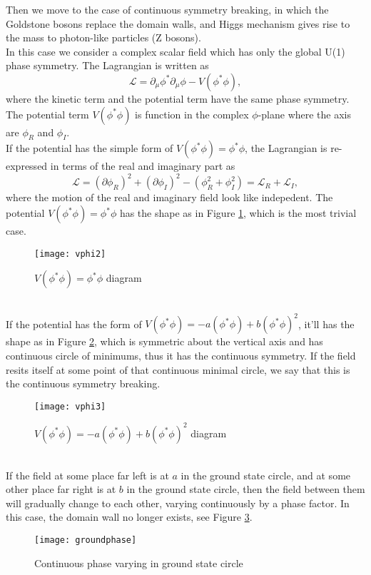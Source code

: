 \documentclass{article}
\newcommand{\be}{\begin{equation}}
\newcommand{\ee}{\end{equation}}
\newcommand{\p}{\partial}
\renewcommand{\1}{\left}
\renewcommand{\2}{\right}
\newcommand{\ma}{\mathcal}
\newcommand{\m}{\mu}
\begin{document}
Then we move to the case of continuous symmetry breaking, in which the Goldstone bosons replace the domain walls, and Higgs mechanism gives rise to the mass to photon-like particles (Z bosons).\\
In this case we consider a complex scalar field which has only the global U(1) phase symmetry. The Lagrangian is written as
\be
\ma L=\p_\m \phi^*\p_\m \phi-V(\phi^*\phi),
\ee
where the kinetic term and the potential term have the same phase symmetry. The potential term $V(\phi^*\phi)$ is function in the complex $\phi$-plane where the axis are $\phi_R$ and $\phi_I$.\\

If the potential has the simple form of $V(\phi^*\phi)=\phi^*\phi$, the Lagrangian is re-expressed in terms of the real and imaginary part as
\be \ma L=(\p\phi_R)^2+(\p\phi_I)^2-(\phi_R^2+\phi_I^2)=\ma L_R+\ma L_I, \ee
where the motion of the real and imaginary field look like indepedent.
The potential $V(\phi^*\phi)=\phi^*\phi$ has the shape as in Figure \ref{vphi2}, which is the most trivial case.
\begin{figure}[h]
\centering
\texttt{[image: vphi2]}
\caption{\label{vphi2}$V(\phi^*\phi)=\phi^*\phi$ diagram}
\end{figure}\\

If the potential has the form of $V(\phi^*\phi)=-a(\phi^*\phi)+b(\phi^*\phi)^2$, it'll has the shape as in Figure \ref{vphi3}, which is symmetric about the vertical axis and has continuous circle of minimums, thus it has the continuous symmetry. If the field resits itself at some point of that continuous minimal circle, we say that this is the continuous symmetry breaking.
\begin{figure}[h]
\centering
\texttt{[image: vphi3]}
\caption{\label{vphi3}$V(\phi^*\phi)=-a(\phi^*\phi)+b(\phi^*\phi)^2$ diagram}
\end{figure}\\

If the field at some place far left is at $a$ in the ground state circle, and at some other place far right is at $b$ in the ground state circle, then the field between them will gradually change to each other, varying continuously by a phase factor. In this case, the domain wall no longer exists, see Figure \ref{gp}.
\begin{figure}[h]
\centering
\texttt{[image: groundphase]}
\caption{\label{gp}Continuous phase varying in ground state circle}
\end{figure}\\
\end{document}
